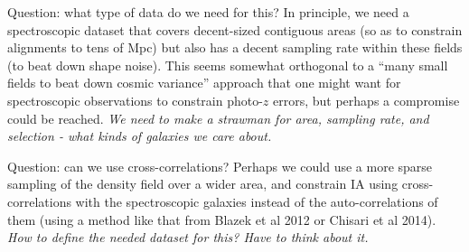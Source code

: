 Question: what type of data do we need for this?  In principle, we need a spectroscopic dataset that
covers decent-sized contiguous areas (so as to constrain alignments to tens of Mpc) but also has a
decent sampling rate within these fields (to beat down shape noise).  This seems somewhat orthogonal
to a ``many small fields to beat down cosmic variance'' approach that one might want for
spectroscopic observations to constrain photo-$z$ errors, but perhaps a compromise could be
reached.  {\em We need to make a strawman for area, sampling rate, and selection - what kinds of
  galaxies we care about.}

Question: can we use cross-correlations?  Perhaps we could use a more sparse sampling of the density
field over a wider area, and constrain IA using cross-correlations with the spectroscopic galaxies
instead of the auto-correlations of them (using a method like that from Blazek et al 2012 or Chisari
et al 2014).  {\em How to define the needed dataset for this?  Have to think about it.}
